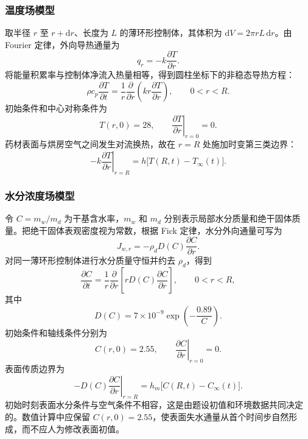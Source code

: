 \documentclass[withoutpreface,bwprint]{cumcmthesis}
\begin{document}
\subsubsection{温度场模型}

取半径 $r$ 至 $r+\mathrm{d}r$、长度为 $L$ 的薄环形控制体，其体积为 $\mathrm{d}V=2\pi rL\,\mathrm{d}r$。由 Fourier 定律，外向导热通量为
\begin{equation}
q_r=-k\frac{\partial T}{\partial r}.
\label{eq:fourier}
\end{equation}
将能量积累率与控制体净流入热量相等，得到圆柱坐标下的非稳态导热方程：
\begin{equation}
\rho c_p\frac{\partial T}{\partial t}
=\frac{1}{r}\frac{\partial}{\partial r}
\left(kr\frac{\partial T}{\partial r}\right),
\qquad 0<r<R.
\label{eq:heat_pde}
\end{equation}
初始条件和中心对称条件为
\begin{equation}
T(r,0)=28,\qquad
\left.\frac{\partial T}{\partial r}\right|_{r=0}=0.
\label{eq:heat_initial_center}
\end{equation}
药材表面与烘房空气之间发生对流换热，故在 $r=R$ 处施加时变第三类边界：
\begin{equation}
-k\left.\frac{\partial T}{\partial r}\right|_{r=R}
=h\bigl[T(R,t)-T_\infty(t)\bigr].
\label{eq:heat_robin}
\end{equation}

\subsubsection{水分浓度场模型}

令 $C=m_w/m_d$ 为干基含水率，$m_w$ 和 $m_d$ 分别表示局部水分质量和绝干固体质量。把绝干固体表观密度视为常数，根据 Fick 定律，水分外向通量可写为
\begin{equation}
J_{w,r}=-\rho_dD(C)\frac{\partial C}{\partial r}.
\label{eq:fick}
\end{equation}
对同一薄环形控制体进行水分质量守恒并约去 $\rho_d$，得到
\begin{equation}
\frac{\partial C}{\partial t}
=\frac{1}{r}\frac{\partial}{\partial r}
\left[rD(C)\frac{\partial C}{\partial r}\right],
\qquad 0<r<R,
\label{eq:moisture_pde}
\end{equation}
其中
\begin{equation}
D(C)=7\times10^{-9}\exp\left(-\frac{0.89}{C}\right).
\label{eq:diffusivity}
\end{equation}
初始条件和轴线条件分别为
\begin{equation}
C(r,0)=2.55,\qquad
\left.\frac{\partial C}{\partial r}\right|_{r=0}=0.
\label{eq:moisture_initial_center}
\end{equation}
表面传质边界为
\begin{equation}
-D(C)\left.\frac{\partial C}{\partial r}\right|_{r=R}
=h_m\bigl[C(R,t)-C_\infty(t)\bigr].
\label{eq:moisture_robin}
\end{equation}
初始时刻表面水分条件与空气条件不相容，这是由题设初值和环境数据共同决定的。数值计算中应保留 $C(r,0)=2.55$，使表面失水通量从首个时间步自然形成，而不应人为修改表面初值。
\end{document}
